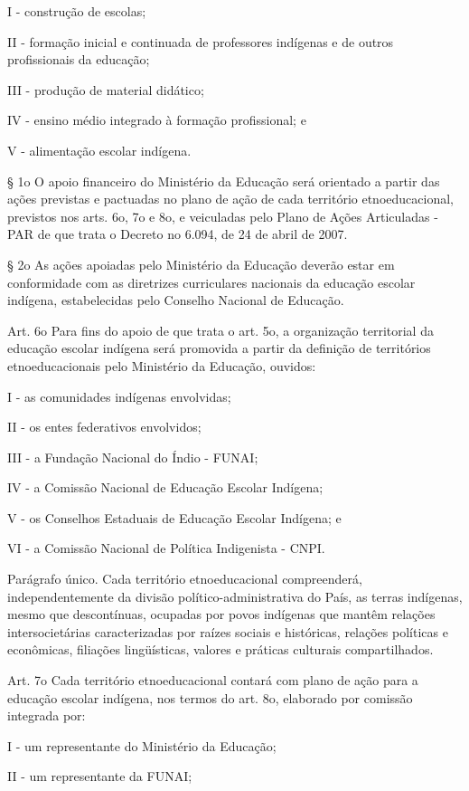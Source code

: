 \documentclass[
]{book}
\begin{document}
I - construção de escolas;

II - formação inicial e continuada de professores indígenas e de outros profissionais da educação;

III - produção de material didático;

IV - ensino médio integrado à formação profissional; e

V - alimentação escolar indígena.

§ 1o O apoio financeiro do Ministério da Educação será orientado a partir das ações previstas e pactuadas no plano de ação de cada território etnoeducacional, previstos nos arts. 6o, 7o e 8o, e veiculadas pelo Plano de Ações Articuladas - PAR de que trata o Decreto no 6.094, de 24 de abril de 2007.

§ 2o As ações apoiadas pelo Ministério da Educação deverão estar em conformidade com as diretrizes curriculares nacionais da educação escolar indígena, estabelecidas pelo Conselho Nacional de Educação.

Art. 6o Para fins do apoio de que trata o art. 5o, a organização territorial da educação escolar indígena será promovida a partir da definição de territórios etnoeducacionais pelo Ministério da Educação, ouvidos:

I - as comunidades indígenas envolvidas;

II - os entes federativos envolvidos;

III - a Fundação Nacional do Índio - FUNAI;

IV - a Comissão Nacional de Educação Escolar Indígena;

V - os Conselhos Estaduais de Educação Escolar Indígena; e

VI - a Comissão Nacional de Política Indigenista - CNPI.

Parágrafo único. Cada território etnoeducacional compreenderá, independentemente da divisão político-administrativa do País, as terras indígenas, mesmo que descontínuas, ocupadas por povos indígenas que mantêm relações intersocietárias caracterizadas por raízes sociais e históricas, relações políticas e econômicas, filiações lingüísticas, valores e práticas culturais compartilhados.

Art. 7o Cada território etnoeducacional contará com plano de ação para a educação escolar indígena, nos termos do art. 8o, elaborado por comissão integrada por:

I - um representante do Ministério da Educação;

II - um representante da FUNAI;
\end{document}
